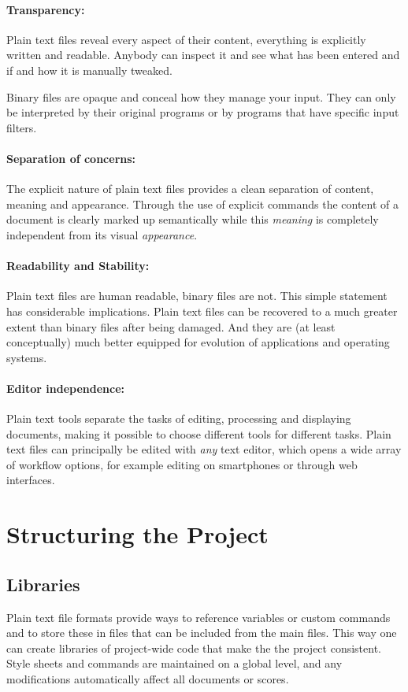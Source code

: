 \documentclass[11pt,a4paper]{article}
\begin{document}
\paragraph{Transparency:}
Plain text files reveal every aspect of their content, everything is explicitly written
and readable. Anybody can inspect it and see what has been entered and if and how it is
manually tweaked.

Binary files are opaque and conceal how they manage your input. They can only be
interpreted by their original programs or by programs that have specific input filters.

\paragraph{Separation of concerns:}
The explicit nature of plain text files provides a clean separation of content, meaning
and appearance. Through the use of explicit commands the content
of a document is clearly marked up semantically while this \emph{meaning} is completely
independent from its visual \emph{appearance}.

\paragraph{Readability and Stability:}
Plain text files are human readable, binary files are not. This simple statement has
considerable implications. Plain text files can be recovered to a much greater extent
than binary files after being damaged. And they are (at least conceptually) much better
equipped for evolution of applications and operating systems.

\paragraph{Editor independence:}
Plain text tools separate the tasks of editing, processing and displaying documents,
making it possible to choose different tools for different tasks. Plain text files
can principally be edited with \emph{any} text editor, which opens a wide array of
workflow options, for example editing on smartphones or through web interfaces.

\section{Structuring the Project}

\subsection{Libraries}
Plain text file formats provide ways to reference variables or custom
commands and to store these in files that can be included from the
main files. This way one can create libraries of project-wide code
that make the the project consistent. Style sheets and commands are
maintained on a global level, and any modifications automatically
affect all documents or scores.
\end{document}
